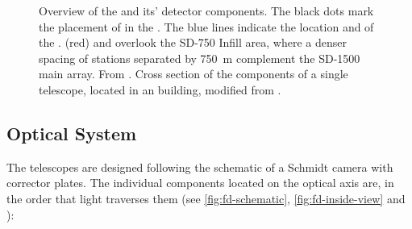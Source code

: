 \begin{figure}[t]
  \centering
  \hspace{0.2cm}
  \caption[]{ Overview of the \PAO and its' detector 
  components. The black dots mark the placement of \WCDs in the \SD. The blue 
  lines indicate the location and \FOV of the \FDs. \HEAT (red) and \CO overlook 
  the SD-750 Infill area, where a denser spacing of stations separated by 
  \SI{750}{\meter} complement the SD-1500 main array. From 
  \cite{vebericIndexHttpWebiapkitedu}.  Cross section 
  of the components of a single telescope, located in an \FD building, modified 
  from \cite{abrahamFluorescenceDetectorPierre2010}.}
  \label{fig:pao-images}
\end{figure}


\subsection{Optical System}
\label{ssec:fd-design}

The \FD telescopes are designed following the schematic of a Schmidt camera with
corrector plates. The individual components located on the optical axis are, in 
the order that light traverses them (see \cref{fig:fd-schematic}, 
\cref{fig:fd-inside-view} and \cite{abrahamFluorescenceDetectorPierre2010}):


